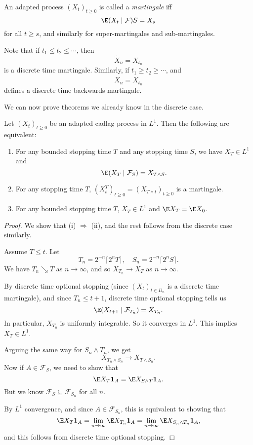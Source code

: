 \documentclass[a4paper]{article}
\begin{document}
\begin{defi}
  An adapted process $(X_t)_{t \geq 0}$ is called a \emph{martingale} iff
  \[
    \E (X_t \mid \mathcal{F})S = X_s
  \]
  for all $t \geq s$, and similarly for super-martingales and sub-martingales.
\end{defi}

Note that if $t_1 \leq t_2 \leq \cdots$, then
\[
  \tilde{X}_n = X_{t_n}
\]
is a discrete time martingale. Similarly, if $t_1 \geq t_2 \geq \cdots$, and
\[
  \hat{X}_n = X_{t_n}
\]
defines a discrete time backwards martingale.

We can now prove theorems we already know in the discrete case.

\begin{thm}
  Let $(X_t)_{t \geq 0}$ be an adapted cadlag process in $L^1$. Then the following are equivalent:
  \begin{enumerate}
    \item For any bounded stopping time $T$ and any stopping time $S$, we have $X_T \in L^1$ and
      \[
        \E(X_T \mid \mathcal{F}_S) = X_{T \wedge S}.
      \]
    \item For any stopping time $T$, $(X_t^T)_{t \geq 0} = (X_{T \wedge t})_{t \geq 0}$ is a martingale.
    \item For any bounded stopping time $T$, $X_T \in L^1$ and $\E X_T = \E X_0$.
  \end{enumerate}
\end{thm}

\begin{proof}
  We show that (i) $\Rightarrow$ (ii), and the rest follows from the discrete case similarly.

  Assume $T \leq t$. Let
  \[
    T_n = 2^{-n} \lceil 2^n T\rceil,\quad S_n = 2^{-n} \lceil 2^n S\rceil.
  \]
  We have $T_n \searrow T$ as $n \to \infty$, and so $X_{T_n} \to X_T$ as $n \to \infty$.

  By discrete time optional stopping (since $(X_t)_{t \in D_n}$ is a discrete time martingale), and since $T_n \leq t + 1$, discrete time optional stopping tells us
  \[
    \E (X_{t + 1} \mid \mathcal{F}_{T_n}) = X_{T_n}.
  \]
  In particular, $X_{T_n}$ is uniformly integrable. So it converges in $L^1$. This implies $X_T \in L^1$.

  Arguing the same way for $S_n \wedge T_n$, we get
  \[
    X_{T_n \wedge S_n} \to X_{T \wedge S_n}.
  \]
  Now if $A \in \mathcal{F}_S$, we need to show that
  \[
    \E X_T \mathbf{1}_A = \E X_{S \wedge T} \mathbf{1}_A.
  \]
  But we know $\mathcal{F}_S \subseteq \mathcal{F}_{S_n}$ for all $n$.

  By $L^1$ convergence, and since $A \in \mathcal{F}_{S_n}$, this is equivalent to showing that
  \[
    \E X_T \mathbf{1}_A = \lim_{n \to \infty} \E X_{T_n} \mathbf{1}_A = \lim_{n \to \infty} \E X_{S_n \wedge T_n} \mathbf{1}_A,
  \]
  and this follows from discrete time optional stopping.
\end{proof}
\end{document}
